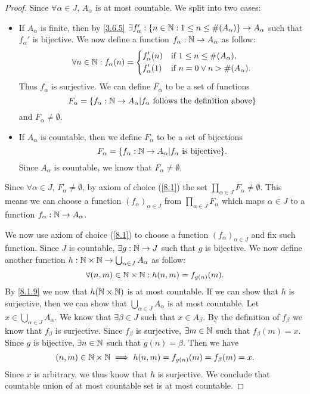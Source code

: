 \begin{proof}
  Since \(\forall \alpha \in J\), \(A_{\alpha}\) is at most countable.
  We split into two cases:
  \begin{itemize}
    \item If \(A_{\alpha}\) is finite, then by \cref{3.6.5} \(\exists f_{\alpha}' : \left\lbrace n \in \mathbb{N} : 1 \leq n \leq \#(A_{\alpha})\right\rbrace \to A_{\alpha}\) such that \(f_{\alpha}'\) is bijective.
          We now define a function \(f_{\alpha} : \mathbb{N} \to A_{\alpha}\) as follow:
          \[
            \forall n \in \mathbb{N} : f_{\alpha}(n) = \begin{dcases}
              f_{\alpha}'(n) & \text{if } 1 \leq n \leq \#(A_{\alpha}),  \\
              f_{\alpha}'(1) & \text{if } n = 0 \lor n > \#(A_{\alpha}).
            \end{dcases}
          \]
          Thus \(f_{\alpha}\) is surjective.
          We can define \(F_{\alpha}\) to be a set of functions
          \[
            F_{\alpha} = \left\lbrace f_{\alpha} : \mathbb{N} \to A_{\alpha} | f_{\alpha} \text{ follows the definition above}\right\rbrace
          \]
          and \(F_{\alpha} \neq \emptyset\).
    \item If \(A_{\alpha}\) is countable, then we define \(F_{\alpha}\) to be a set of bijections
          \[
            F_{\alpha} = \set{f_{\alpha} : \N \to A_{\alpha} | f_{\alpha} \text{ is bijective}}.
          \]
          Since \(A_{\alpha}\) is countable, we know that \(F_{\alpha} \neq \emptyset\).
  \end{itemize}
  Since \(\forall \alpha \in J\), \(F_{\alpha} \neq \emptyset\), by axiom of choice (\cref{8.1}) the set \(\prod_{\alpha \in J} F_{\alpha} \neq \emptyset\).
  This means we can choose a function \((f_{\alpha})_{\alpha \in J}\) from \(\prod_{\alpha \in J} F_{\alpha}\) which maps \(\alpha \in J\) to a function \(f_{\alpha} : \mathbb{N} \to A_{\alpha}\).

  We now use axiom of choice (\cref{8.1}) to choose a function \((f_{\alpha})_{\alpha \in J}\) and fix such function.
  Since \(J\) is countable, \(\exists g : \mathbb{N} \to J\) such that \(g\) is bijective.
  We now define another function \(h : \mathbb{N} \times \mathbb{N} \to \bigcup_{\alpha \in J} A_{\alpha}\) as follow:
  \[
    \forall (n, m) \in \mathbb{N} \times \mathbb{N} : h(n, m) = f_{g(n)}(m).
  \]
  By \cref{8.1.9} we now that \(h(\mathbb{N} \times \mathbb{N})\) is at most countable.
  If we can show that \(h\) is surjective, then we can show that \(\bigcup_{\alpha \in J} A_{\alpha}\) is at most countable.
  Let \(x \in \bigcup_{\alpha \in J} A_{\alpha}\).
  We know that \(\exists \beta \in J\) such that \(x \in A_{\beta}\).
  By the definition of \(f_{\beta}\) we know that \(f_{\beta}\) is surjective.
  Since \(f_{\beta}\) is surjective, \(\exists m \in \mathbb{N}\) such that \(f_{\beta}(m) = x\).
  Since \(g\) is bijective, \(\exists n \in \mathbb{N}\) such that \(g(n) = \beta\).
  Then we have
  \[
    (n, m) \in \mathbb{N} \times \mathbb{N} \implies h(n, m) = f_{g(n)}(m) = f_{\beta}(m) = x.
  \]
  Since \(x\) is arbitrary, we thus know that \(h\) is surjective.
  We conclude that countable union of at most countable set is at most countable.


\end{proof}
